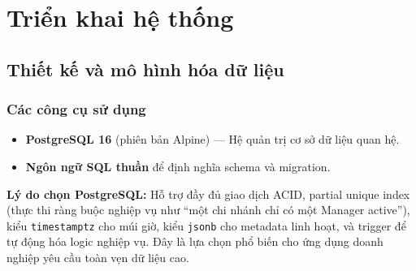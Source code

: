 \chapter{Triển khai hệ thống}

\section{Thiết kế và mô hình hóa dữ liệu}
\subsection{Các công cụ sử dụng}
\begin{itemize}
    \item \textbf{PostgreSQL 16} (phiên bản Alpine) — Hệ quản trị cơ sở dữ liệu quan hệ.
    \item \textbf{Ngôn ngữ SQL thuần} để định nghĩa schema và migration.
\end{itemize}
\textbf{Lý do chọn PostgreSQL:} Hỗ trợ đầy đủ giao dịch ACID, partial unique index (thực thi ràng buộc nghiệp vụ như ``một chi nhánh chỉ có một Manager active''), kiểu \texttt{timestamptz} cho múi giờ, kiểu \texttt{jsonb} cho metadata linh hoạt, và trigger để tự động hóa logic nghiệp vụ. Đây là lựa chọn phổ biến cho ứng dụng doanh nghiệp yêu cầu toàn vẹn dữ liệu cao.

